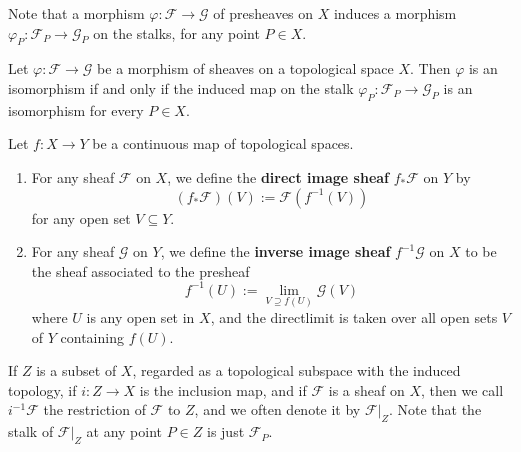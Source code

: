\documentclass[12pt, oneside]{book}
\begin{document}
\begin{proposition}
    Note that a morphism $\varphi: \mathscr{F} \rightarrow \mathscr{G}$ of presheaves on $X$ induces a morphism $\varphi_P: \mathscr{F}_P \rightarrow \mathscr{G}_P$ on the stalks, for any point $P \in X$.

    Let $\varphi: \mathscr{F} \rightarrow \mathscr{G}$ be a morphism of sheaves on a topological space $X$. Then $\varphi$ is an isomorphism if and only if the induced map on the stalk $\varphi_P: \mathscr{F}_P \rightarrow \mathscr{G}_P$ is an isomorphism for every $P \in X$.
\end{proposition}




\begin{definition}
    Let $f: X \rightarrow Y$ be a continuous map of topological spaces.

    \begin{enumerate}
        \item
              For any sheaf $\mathscr{F}$ on $X$, we define the \textbf{direct image sheaf} $f_* \mathscr{F}$ on $Y$ by
              \begin{equation*}
                  \left(f_* \mathscr{F}\right)(V):=\mathscr{F}\left(f^{-1}(V)\right)
              \end{equation*}
              for any open set $V \subseteq Y$.

        \item
              For any sheaf $\mathscr{G}$ on $Y$, we define the \textbf{inverse image sheaf} $f^{-1} \mathscr{G}$ on $X$ to be the sheaf associated to the presheaf
              \begin{equation*}
                  f^{-1}(U)
                  :=
                  \lim _{V \supseteq f(U)} \mathscr{G}(V)
              \end{equation*}
              where $U$ is any open set in $X$, and the directlimit is taken over all open sets $V$ of $Y$ containing $f(U)$.
    \end{enumerate}
\end{definition}


\begin{definition}
    If $Z$ is a subset of $X$, regarded as a topological subspace with the induced topology, if $i: Z \rightarrow X$ is the inclusion map, and if $\mathscr{F}$ is a sheaf on $X$, then we call $i^{-1} \mathscr{F}$ the restriction of $\mathscr{F}$ to $Z$, and we often denote it by $\left.\mathscr{F}\right|_Z$. Note that the stalk of $\left.\mathscr{F}\right|_Z$ at any point $P \in Z$ is just $\mathscr{F}_P$.
\end{definition}
\end{document}
